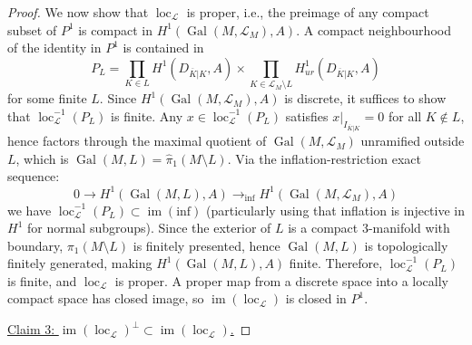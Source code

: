 \documentclass[10pt,a4paper]{amsart}
\DeclareMathOperator{\Gal}{\mathrm{Gal}}
\DeclareMathOperator{\im}{\mathrm{im}}
\DeclareMathOperator{\loc}{\mathrm{loc}}
\theoremstyle{plain}
\theoremstyle{definition}
\theoremstyle{remark}
\begin{document}
\begin{proof}
\medskip

We now show that $\loc_{\mathcal{L}}$ is proper, i.e., the preimage of any compact subset of $P^1$ is compact in $H^1(\Gal(M, \mathcal{L}_M), A)$. A compact neighbourhood of the identity in $P^1$ is contained in 
\begin{equation}
    P_L = \prod_{K \in L}H^1(D_{\overline{K}|K}, A) \times \prod_{K \in \mathcal{L}_M \setminus L}H^1_{ur}(D_{\overline{K}|K}, A)
\end{equation}
for some finite $L$. Since $H^1(\Gal(M, \mathcal{L}_M), A)$ is discrete, it suffices to show that $\loc_{\mathcal{L}}^{-1}(P_L)$ is finite. Any $x \in \loc_{\mathcal{L}}^{-1}(P_L)$ satisfies $x|_{I_{\overline{K}|K}} = 0$ for all $K \notin L$, hence factors through the maximal quotient of $\Gal(M, \mathcal{L}_M)$ unramified outside $L$, which is $\Gal(M, L) = \widehat{\pi}_1(M \setminus L)$. Via the inflation-restriction exact sequence:
\begin{equation}
    0 \to H^1(\Gal(M, L), A) \to_{\text{inf}} H^1(\Gal(M, \mathcal{L}_M), A)
\end{equation}
we have $\loc_{\mathcal{L}}^{-1}(P_L) \subset \im(\text{inf})$ (particularly using that inflation is injective in $H^1$ for normal subgroups). Since the exterior of $L$ is a compact 3-manifold with boundary, $\pi_1(M \setminus L)$ is finitely presented, hence $\Gal(M, L)$ is topologically finitely generated, making $H^1(\Gal(M, L), A)$ finite. Therefore, $\loc_{\mathcal{L}}^{-1}(P_L)$ is finite, and $\loc_{\mathcal{L}}$ is proper. A proper map from a discrete space into a locally compact space has closed image, so $\im(\loc_{\mathcal{L}})$ is closed in $P^1$. 

\medskip

\underline{Claim 3: $\im(\loc_{\mathcal{L}})^\perp \subset \im(\loc_{\mathcal{L}})$.}

\medskip


\end{proof}
\end{document}
